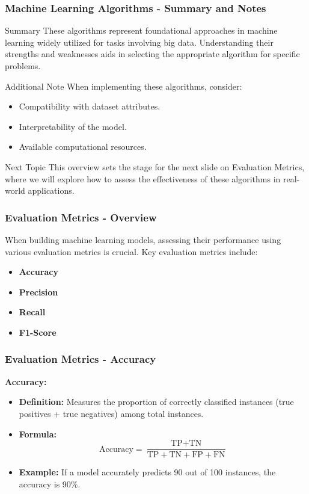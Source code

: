 \documentclass[aspectratio=169]{beamer}
\begin{document}
\begin{frame}[fragile]
    \frametitle{Machine Learning Algorithms - Summary and Notes}
    \begin{block}{Summary}
        These algorithms represent foundational approaches in machine learning widely utilized for tasks involving big data. Understanding their strengths and weaknesses aids in selecting the appropriate algorithm for specific problems.
    \end{block}
    
    \begin{block}{Additional Note}
        When implementing these algorithms, consider:
        \begin{itemize}
            \item Compatibility with dataset attributes.
            \item Interpretability of the model.
            \item Available computational resources.
        \end{itemize}
    \end{block}
    
    \begin{block}{Next Topic}
        This overview sets the stage for the next slide on Evaluation Metrics, where we will explore how to assess the effectiveness of these algorithms in real-world applications.
    \end{block}
\end{frame}

\begin{frame}[fragile]
    \frametitle{Evaluation Metrics - Overview}
    When building machine learning models, assessing their performance using various evaluation metrics is crucial. 
    Key evaluation metrics include:
    \begin{itemize}
        \item \textbf{Accuracy}
        \item \textbf{Precision}
        \item \textbf{Recall}
        \item \textbf{F1-Score}
    \end{itemize}
\end{frame}

\begin{frame}[fragile]
    \frametitle{Evaluation Metrics - Accuracy}
    \textbf{Accuracy:}
    \begin{itemize}
        \item \textbf{Definition:} Measures the proportion of correctly classified instances (true positives + true negatives) among total instances.
        \item \textbf{Formula:}
        \begin{equation}
        \text{Accuracy} = \frac{\text{TP} + \text{TN}}{\text{TP} + \text{TN} + \text{FP} + \text{FN}}
        \end{equation}
        \item \textbf{Example:} If a model accurately predicts 90 out of 100 instances, the accuracy is 90\%.
    \end{itemize}
\end{frame}
\end{document}
